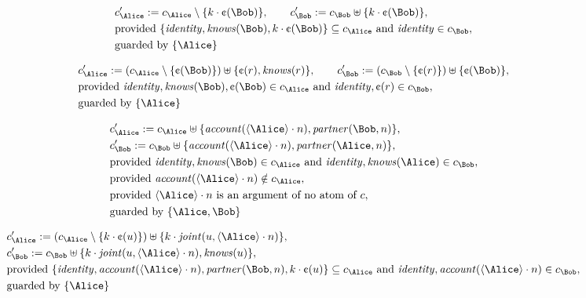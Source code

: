 \begin{align*}
&
c'_
{
\Alice
}
 := 
c_
{
\Alice
}
 \setminus 
\{
k
\cdot
\text{\textcent}
(
\Bob
)
\}
, \qquad 
c'_
{
\Bob
}
 := 
c_
{
\Bob
}
 \uplus 
\{
k
\cdot
\text{\textcent}
(
\Bob
)
\}
,\\
&
\text{provided } 
\{
\mathit{
identity
}
,
\mathit{
knows
}
(
\Bob
)
,
k
\cdot
\text{\textcent}
(
\Bob
)
\}
 \subseteq c_
{
\Alice
}
 \text{ and } 
\mathit{
identity
}
 \in c_
{
\Bob
}
,\\
&
\text{guarded by } \{
\Alice
\}
\end{align*}

\begin{align*}
&
c'_
{
\Alice
}
 := 
(c_
{
\Alice
}
 \setminus 
\{
\text{\textcent}
(
\Bob
)
\}
) \uplus 
\{
\text{\textcent}
(
r
)
,
\mathit{
knows
}
(
r
)
\}
, \qquad 
c'_
{
\Bob
}
 := 
(c_
{
\Bob
}
 \setminus 
\{
\text{\textcent}
(
r
)
\}
) \uplus 
\{
\text{\textcent}
(
\Bob
)
\}
,\\
&
\text{provided } 
\mathit{
identity
}
,
\mathit{
knows
}
(
\Bob
)
,
\text{\textcent}
(
\Bob
)
 \in c_
{
\Alice
}
 \text{ and } 
\mathit{
identity
}
,
\text{\textcent}
(
r
)
 \in c_
{
\Bob
}
,\\
&
\text{guarded by } \{
\Alice
\}
\end{align*}

\begin{align*}
&
c'_
{
\Alice
}
 := 
c_
{
\Alice
}
 \uplus 
\{
\mathit{
account
}
(
\langle
\Alice
\rangle
\cdot
n
)
,
\mathit{
partner
}
(
\Bob
,
n
)
\}
,\\
&
c'_
{
\Bob
}
 := 
c_
{
\Bob
}
 \uplus 
\{
\mathit{
account
}
(
\langle
\Alice
\rangle
\cdot
n
)
,
\mathit{
partner
}
(
\Alice
,
n
)
\}
,\\
&
\text{provided } 
\mathit{
identity
}
,
\mathit{
knows
}
(
\Bob
)
 \in c_
{
\Alice
}
 \text{ and } 
\mathit{
identity
}
,
\mathit{
knows
}
(
\Alice
)
 \in c_
{
\Bob
}
,\\
&
\text{provided } 
\mathit{
account
}
(
\langle
\Alice
\rangle
\cdot
n
)
 \notin c_
{
\Alice
}
,\\
&
\text{provided } 
\langle
\Alice
\rangle
\cdot
n
 \text{ is an argument of no atom of } c
,\\
&
\text{guarded by } \{
\Alice
,
\Bob
\}
\end{align*}

\begin{align*}
&
c'_
{
\Alice
}
 := 
(c_
{
\Alice
}
 \setminus 
\{
k
\cdot
\text{\textcent}
(
u
)
\}
) \uplus 
\{
k
\cdot
\mathit{
joint
}
(
u
,
\langle
\Alice
\rangle
\cdot
n
)
\}
,\\
&
c'_
{
\Bob
}
 := 
c_
{
\Bob
}
 \uplus 
\{
k
\cdot
\mathit{
joint
}
(
u
,
\langle
\Alice
\rangle
\cdot
n
)
,
\mathit{
knows
}
(
u
)
\}
,\\
&
\text{provided } 
\{
\mathit{
identity
}
,
\mathit{
account
}
(
\langle
\Alice
\rangle
\cdot
n
)
,
\mathit{
partner
}
(
\Bob
,
n
)
,
k
\cdot
\text{\textcent}
(
u
)
\}
 \subseteq c_
{
\Alice
}
 \text{ and } 
\mathit{
identity
}
,
\mathit{
account
}
(
\langle
\Alice
\rangle
\cdot
n
)
 \in c_
{
\Bob
}
,\\
&
\text{guarded by } \{
\Alice
\}
\end{align*}
